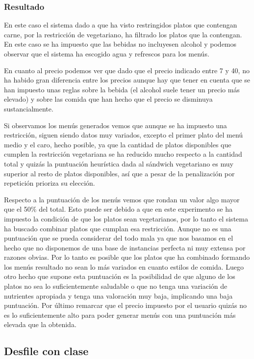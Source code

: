 \documentclass{article}
\begin{document}
\subsubsection{Resultado}
En este caso el sistema dado a que ha visto restringidos platos que contengan carne, por la restricción de vegetariano, ha filtrado los platos que la contengan. En este caso se ha impuesto que las bebidas no incluyesen alcohol y podemos observar que el sistema ha escogido agua y refrescos para los menús.
\par
En cuanto al precio podemos ver que dado que el precio indicado entre 7 y 40, no ha habido gran diferencia entre los precios aunque hay que tener en cuenta que se han impuesto unas reglas sobre la bebida (el alcohol suele tener un precio más elevado) y sobre las comida que han hecho que el precio se disminuya sustancialmente.
\par
Si observamos los menús generados vemos que aunque se ha impuesto una restricción, siguen siendo datos muy variados, excepto el primer plato del menú medio y el caro, hecho posible, ya que la cantidad de platos disponibles que cumplen la restricción vegetariana se ha reducido mucho respecto a la cantidad total y quizás la puntuación heurística dada al sándwich vegetariano es muy superior al resto de platos disponibles, así que a pesar de la penalización por repetición prioriza su elección.
\par
Respecto a la puntuación de los menús vemos que rondan un valor algo mayor que el 50\% del total. Esto puede ser debido a que en este experimento se ha impuesto la condición de que los platos sean vegetarianos, por lo tanto el sistema ha buscado combinar platos que cumplan esa restricción. Aunque no es una puntuación que se pueda considerar del todo mala ya que nos basamos en el hecho que no disponemos de una base de instancias perfecta ni muy extensa por razones obvias. Por lo tanto es posible que los platos que ha combinado formando los menús resultado no sean lo más variados en cuanto estilos de comida. Luego otro hecho que supone esta puntuación es la posibilidad de que alguno de los platos no sea lo suficientemente saludable o que no tenga una variación de nutrientes apropiada y tenga una valoración muy baja, implicando una baja puntuación. Por último remarcar que el precio impuesto por el usuario quizás no es lo suficientemente alto para poder generar menús con una puntuación más elevada que la obtenida.

\subsection{Desfile con clase}
\end{document}

